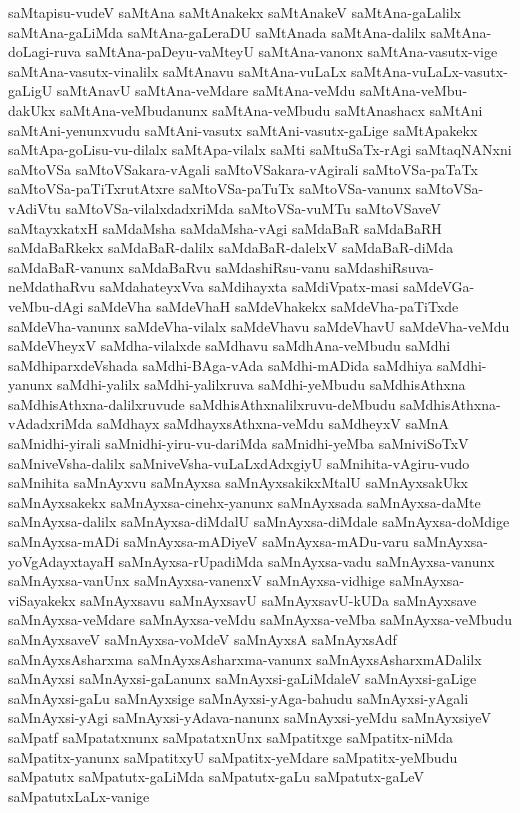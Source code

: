 {saMtapisu-vudeV
saMtAna
saMtAnakekx
saMtAnakeV
saMtAna-gaLalilx
saMtAna-gaLiMda
saMtAna-gaLeraDU
saMtAnada
saMtAna-dalilx
saMtAna-doLagi-ruva
saMtAna-paDeyu-vaMteyU
saMtAna-vanonx
saMtAna-vasutx-vige
saMtAna-vasutx-vinalilx
saMtAnavu
saMtAna-vuLaLx
saMtAna-vuLaLx-vasutx-gaLigU
saMtAnavU
saMtAna-veMdare
saMtAna-veMdu
saMtAna-veMbu-dakUkx
saMtAna-veMbudanunx
saMtAna-veMbudu
saMtAnashacx
saMtAni
saMtAni-yenunxvudu
saMtAni-vasutx
saMtAni-vasutx-gaLige
saMtApakekx
saMtApa-goLisu-vu-dilalx
saMtApa-vilalx
saMti
saMtuSaTx-rAgi
saMtaqNANxni
saMtoVSa
saMtoVSakara-vAgali
saMtoVSakara-vAgirali
saMtoVSa-paTaTx
saMtoVSa-paTiTxrutAtxre
saMtoVSa-paTuTx
saMtoVSa-vanunx
saMtoVSa-vAdiVtu
saMtoVSa-vilalxdadxriMda
saMtoVSa-vuMTu
saMtoVSaveV
saMtayxkatxH
saMdaMsha
saMdaMsha-vAgi
saMdaBaR
saMdaBaRH
saMdaBaRkekx
saMdaBaR-dalilx
saMdaBaR-dalelxV
saMdaBaR-diMda
saMdaBaR-vanunx
saMdaBaRvu
saMdashiRsu-vanu
saMdashiRsuva-neMdathaRvu
saMdahateyxVva
saMdihayxta
saMdiVpatx-masi
saMdeVGa-veMbu-dAgi
saMdeVha
saMdeVhaH
saMdeVhakekx
saMdeVha-paTiTxde
saMdeVha-vanunx
saMdeVha-vilalx
saMdeVhavu
saMdeVhavU
saMdeVha-veMdu
saMdeVheyxV
saMdha-vilalxde
saMdhavu
saMdhAna-veMbudu
saMdhi
saMdhiparxdeVshada
saMdhi-BAga-vAda
saMdhi-mADida
saMdhiya
saMdhi-yanunx
saMdhi-yalilx
saMdhi-yalilxruva
saMdhi-yeMbudu
saMdhisAthxna
saMdhisAthxna-dalilxruvude
saMdhisAthxnalilxruvu-deMbudu
saMdhisAthxna-vAdadxriMda
saMdhayx
saMdhayxsAthxna-veMdu
saMdheyxV
saMnA
saMnidhi-yirali
saMnidhi-yiru-vu-dariMda
saMnidhi-yeMba
saMniviSoTxV
saMniveVsha-dalilx
saMniveVsha-vuLaLxdAdxgiyU
saMnihita-vAgiru-vudo
saMnihita
saMnAyxvu
saMnAyxsa
saMnAyxsakikxMtalU
saMnAyxsakUkx
saMnAyxsakekx
saMnAyxsa-cinehx-yanunx
saMnAyxsada
saMnAyxsa-daMte
saMnAyxsa-dalilx
saMnAyxsa-diMdalU
saMnAyxsa-diMdale
saMnAyxsa-doMdige
saMnAyxsa-mADi
saMnAyxsa-mADiyeV
saMnAyxsa-mADu-varu
saMnAyxsa-yoVgAdayxtayaH
saMnAyxsa-rUpadiMda
saMnAyxsa-vadu
saMnAyxsa-vanunx
saMnAyxsa-vanUnx
saMnAyxsa-vanenxV
saMnAyxsa-vidhige
saMnAyxsa-viSayakekx
saMnAyxsavu
saMnAyxsavU
saMnAyxsavU-kUDa
saMnAyxsave
saMnAyxsa-veMdare
saMnAyxsa-veMdu
saMnAyxsa-veMba
saMnAyxsa-veMbudu
saMnAyxsaveV
saMnAyxsa-voMdeV
saMnAyxsA
saMnAyxsAdf
saMnAyxsAsharxma
saMnAyxsAsharxma-vanunx
saMnAyxsAsharxmADalilx
saMnAyxsi
saMnAyxsi-gaLanunx
saMnAyxsi-gaLiMdaleV
saMnAyxsi-gaLige
saMnAyxsi-gaLu
saMnAyxsige
saMnAyxsi-yAga-bahudu
saMnAyxsi-yAgali
saMnAyxsi-yAgi
saMnAyxsi-yAdava-nanunx
saMnAyxsi-yeMdu
saMnAyxsiyeV
saMpatf
saMpatatxnunx
saMpatatxnUnx
saMpatitxge
saMpatitx-niMda
saMpatitx-yanunx
saMpatitxyU
saMpatitx-yeMdare
saMpatitx-yeMbudu
saMpatutx
saMpatutx-gaLiMda
saMpatutx-gaLu
saMpatutx-gaLeV
saMpatutxLaLx-vanige
}
